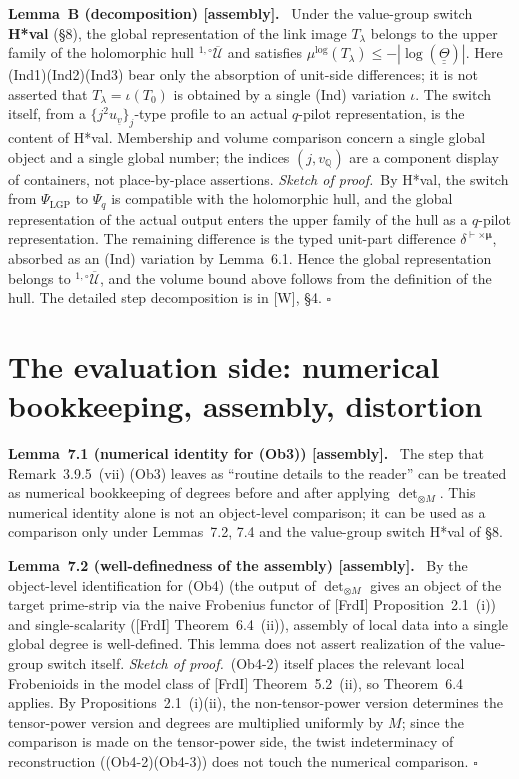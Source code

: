 \documentclass[11pt]{article}
\newcommand{\cU}{\mathcal U}
\newcommand{\uu}[1]{\underline{\underline{#1}}}
\newcommand{\stmt}[2]{\medskip\noindent\textbf{#1\ #2.}\ }
\newcommand{\pfs}{\medskip\noindent\textit{Sketch of proof.}\ }
\newcommand{\qedh}{\hfill\(\square\)\par\medskip}
\begin{document}
\stmt{Lemma}{B (decomposition) [assembly]}
Under the value-group switch \textbf{H*val} (\S8), the global
representation of the link image $T_\lambda$ belongs to the upper
family of the holomorphic hull ${}^{1,\circ}\overline{\cU}$ and
satisfies
$\mu^{\log}(T_\lambda)\le-|\log(\uu\Theta)|$.  Here
(Ind1)(Ind2)(Ind3) bear only the absorption of unit-side
differences; it is not asserted that $T_\lambda=\iota(T_0)$ is
obtained by a single (Ind) variation $\iota$.  The switch itself,
from a $\{j^2u_{\underline v}\}_j$-type profile to an actual
$q$-pilot representation, is the content of H*val.  Membership and
volume comparison concern a single global object and a single
global number; the indices $(j,v_{\mathbb Q})$ are a component
display of containers, not place-by-place assertions.
\pfs By H*val, the switch from $\Psi_{\mathrm{LGP}}$ to $\Psi_q$ is
compatible with the holomorphic hull, and the global representation
of the actual output enters the upper family of the hull as a
$q$-pilot representation.  The remaining difference is the typed
unit-part difference
$\delta^{\vdash\times\boldsymbol\mu}$, absorbed as an (Ind)
variation by Lemma~6.1.  Hence the global representation belongs
to ${}^{1,\circ}\overline{\cU}$, and the volume bound above follows
from the definition of the hull.  The detailed step decomposition
is in [W], \S4. \qedh

\section{The evaluation side: numerical bookkeeping, assembly, distortion}

\stmt{Lemma}{7.1 (numerical identity for (Ob3)) [assembly]}
The step that Remark~3.9.5~(vii) (Ob3) leaves as ``routine details
to the reader'' can be treated as numerical bookkeeping of degrees
before and after applying $\det_{\otimes M}$.  This numerical
identity alone is not an object-level comparison; it can be used as
a comparison only under Lemmas~7.2, 7.4 and the value-group switch
H*val of \S8.

\stmt{Lemma}{7.2 (well-definedness of the assembly) [assembly]}
By the object-level identification for (Ob4) (the output of
$\det_{\otimes M}$ gives an object of the target prime-strip via
the naive Frobenius functor of [FrdI] Proposition~2.1~(i)) and
single-scalarity ([FrdI] Theorem~6.4~(ii)), assembly of local data
into a single global degree is well-defined.  This lemma does not
assert realization of the value-group switch itself.
\pfs (Ob4-2) itself places the relevant local Frobenioids in the
model class of [FrdI] Theorem~5.2~(ii), so Theorem~6.4 applies.  By
Propositions~2.1~(i)(ii), the non-tensor-power version determines
the tensor-power version and degrees are multiplied uniformly by
$M$; since the comparison is made on the tensor-power side, the
twist indeterminacy of reconstruction ((Ob4-2)(Ob4-3)) does not
touch the numerical comparison. \qedh
\end{document}
